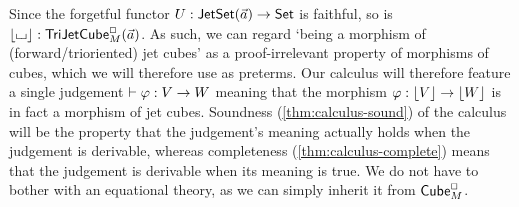 \documentclass[a4paper]{memoir}
\begin{document}
Since the forgetful functor $U : \mathsf{JetSet}(\vec a) \to {\mathsf{Set}}$ is faithful, so is $\mathopen{}\left\lfloor {\llcorner\hspace{-.4ex}\lrcorner} \right\rfloor\mathclose{} : \mathsf{TriJetCube}^{\Box}_{M}\mathopen{}\left( \vec a \right)\mathclose{}$.
As such, we can regard `being a morphism of (forward/trioriented) jet cubes' as a proof-irrelevant property of morphisms of cubes, which we will therefore use as preterms.
Our calculus will therefore feature a single judgement $\vdash \varphi : V \to W$ meaning that the morphism $\varphi : \mathopen{}\left\lfloor V \right\rfloor\mathclose{} \to \mathopen{}\left\lfloor W \right\rfloor\mathclose{}$ is in fact a morphism of jet cubes.
Soundness (\cref{thm:calculus-sound}) of the calculus will be the property that the judgement's meaning actually holds when the judgement is derivable, whereas completeness (\cref{thm:calculus-complete}) means that the judgement is derivable when its meaning is true.
We do not have to bother with an equational theory, as we can simply inherit it from ${\mathsf{Cube}}_M^\Box$.
\end{document}
